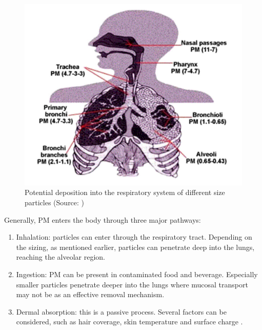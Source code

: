 \begin{figure}[H]
\centering
    \includegraphics[scale=0.3]{images/Lungs.png}
    \caption{Potential deposition into the respiratory system of different size particles (Source: \cite{kim2015review})
}
    \label{fig:Lungs}
\end{figure}

Generally, PM enters the body through three major pathways:
\begin{enumerate}
    \item Inhalation: particles can enter through the respiratory tract. Depending on the sizing, as mentioned earlier, particles can penetrate deep into the lungs, reaching the alveolar region.
    \item Ingestion: PM can be present in contaminated food and beverage. Especially smaller particles penetrate deeper into the lungs where mucosal transport may not be as an effective removal mechanism.
    \item Dermal absorption: this is a passive process. Several factors can be considered, such as hair coverage, skin temperature and surface charge \cite{thompson2018airborne}.
\end{enumerate} 

